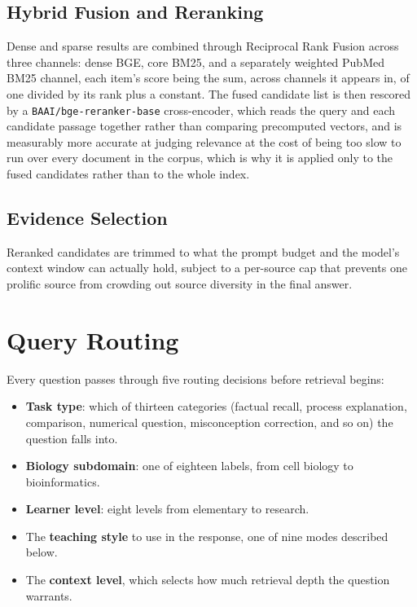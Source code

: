 \subsection{Hybrid Fusion and Reranking}\label{3.3.3}

Dense and sparse results are combined through Reciprocal Rank Fusion
across three channels: dense BGE, core BM25, and a separately weighted
PubMed BM25 channel, each item's score being the sum, across channels
it appears in, of one divided by its rank plus a constant. The fused
candidate list is then rescored by a \texttt{BAAI/bge-reranker-base}
cross-encoder, which reads the query and each candidate passage together
rather than comparing precomputed vectors, and is measurably more accurate
at judging relevance at the cost of being too slow to run over every
document in the corpus, which is why it is applied only to the fused
candidates rather than to the whole index.

\subsection{Evidence Selection}\label{3.3.4}

Reranked candidates are trimmed to what the prompt budget and the model's
context window can actually hold, subject to a per-source cap that
prevents one prolific source from crowding out source diversity in the
final answer.

\section{Query Routing}\label{3.4}

Every question passes through five routing decisions before retrieval
begins:

\begin{itemize}
\item \textbf{Task type}: which of thirteen categories (factual recall,
process explanation, comparison, numerical question, misconception
correction, and so on) the question falls into.
\item \textbf{Biology subdomain}: one of eighteen labels, from cell
biology to bioinformatics.
\item \textbf{Learner level}: eight levels from elementary to research.
\item The \textbf{teaching style} to use in the response, one of nine
modes described below.
\item The \textbf{context level}, which selects how much retrieval depth
the question warrants.
\end{itemize}

